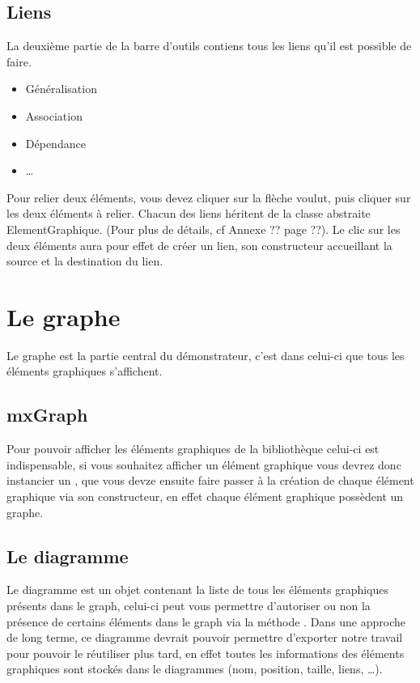 \documentclass[12pt,a4paper,openany]{report}
\begin{document}
	\subsection{Liens}
	La deuxième partie de la barre d'outils contiens tous les liens qu'il est possible de faire.
	\begin{itemize}
		\item Généralisation
		\item Association
		\item Dépendance
		\item \ldots
	\end{itemize}
	Pour relier deux éléments, vous devez cliquer sur la flèche voulut, puis cliquer sur les deux éléments à relier. 
	Chacun des liens héritent de la classe abstraite ElementGraphique. (Pour plus de détails, cf Annexe ?? page ??).%
	Le clic sur les deux éléments aura pour effet de créer un lien, son constructeur accueillant la source et la destination du lien.
	
	\section{Le graphe}
	Le graphe est la partie central du démonstrateur, c'est dans celui-ci que tous les éléments graphiques s'affichent.

	\subsection{mxGraph}
	Pour pouvoir afficher les éléments graphiques de la bibliothèque celui-ci est indispensable, si vous souhaitez
	afficher un élément graphique vous devrez donc instancier un , que vous devze ensuite faire passer
	à la création de chaque élément graphique via son constructeur, en effet chaque élément graphique possèdent un graphe.

	\subsection{Le diagramme}
	Le diagramme est un objet contenant la liste de tous les éléments graphiques présents dans le graph, celui-ci peut vous permettre
	d'autoriser ou non la présence de certains éléments dans le graph via la méthode . Dans une approche de long
	terme, ce diagramme devrait pouvoir permettre d'exporter notre travail pour pouvoir le réutiliser plus tard, 
	en effet toutes les informations des éléments graphiques sont stockés dans le diagrammes (nom, position, taille, liens, \ldots).
\end{document}
